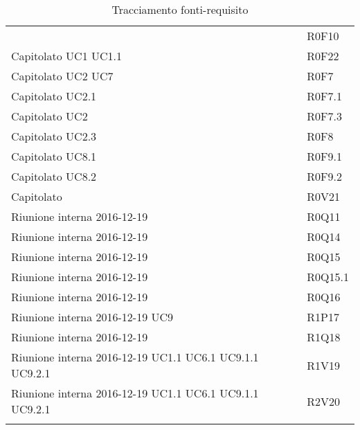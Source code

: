 \documentclass[../AnalisiDeiRequisiti.tex]{subfiles}
\begin{document}
\begin{longtable}{p{5cm}!{\VRule[1pt]}p{5cm}}
		& R0F10 \\
		Capitolato \newline UC1
		\newline UC1.1
		& R0F22 \\
		Capitolato \newline UC2
		\newline UC7
		& R0F7 \\
		Capitolato \newline UC2.1
		& R0F7.1 \\
		Capitolato \newline UC2
		& R0F7.3 \\
		Capitolato \newline UC2.3
		& R0F8 \\
		Capitolato \newline UC8.1
		& R0F9.1 \\
		Capitolato \newline UC8.2
		& R0F9.2 \\
		Capitolato & R0V21 \\
		Riunione interna 2016-12-19 & R0Q11 \\
		Riunione interna 2016-12-19 & R0Q14 \\
		Riunione interna 2016-12-19 & R0Q15 \\
		Riunione interna 2016-12-19 & R0Q15.1 \\
		Riunione interna 2016-12-19 & R0Q16 \\
		Riunione interna 2016-12-19 \newline UC9
		& R1P17 \\
		Riunione interna 2016-12-19 & R1Q18 \\
		Riunione interna 2016-12-19 \newline UC1.1
		\newline UC6.1
		\newline UC9.1.1
		\newline UC9.2.1
		& R1V19 \\
		Riunione interna 2016-12-19 \newline UC1.1
		\newline UC6.1
		\newline UC9.1.1
		\newline UC9.2.1
		& R2V20 \\
		\caption{Tracciamento fonti-requisito}
	\end{longtable}
	
	\newpage
\end{document}
